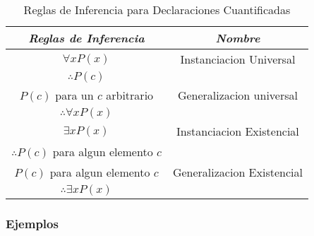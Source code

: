 \documentclass[]{article}
\begin{document}
\begin{table}[H]
	\caption*{Reglas de Inferencia para Declaraciones Cuantificadas}
	\begin{center}
		\begin{tabular}{| c | c |}
			\hline
			\textbf{\textit{Reglas de Inferencia}} & \textbf{\textit{Nombre}}\\
			\hline
			$\forall xP(x)$  & Instanciacion Universal\\
			$\therefore P(c)$ & \\
			\hline
			$P(c)$ para un $c$ arbitrario & Generalizacion universal\\
			$\therefore \forall xP(x)$  & \\
			\hline
			$\exists xP(x)$ & Instanciacion Existencial\\
			$\therefore P(c)$ para algun elemento $c$ & \\
			\hline
			$P(c)$ para algun elemento $c$ & Generalizacion Existencial\\
			$\therefore \exists xP(x)$ & \\
			\hline
		\end{tabular}
	\end{center}
\end{table}

\subsubsection*{Ejemplos}
\end{document}
